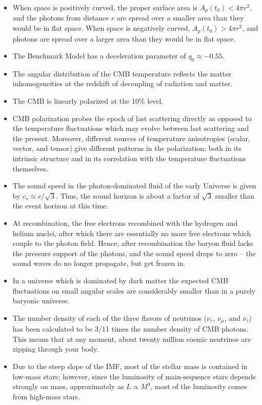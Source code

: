 \documentclass[a4paper,10pt]{article}
\begin{document}
\begin{itemize}
    \item When space is positively curved, the proper surface area is $A_p(t_0) < 4\pi r^2$, and the photons from distance $r$ are spread over a smaller area than they would be in flat space. When space is negatively curved, $A_p(t_0) > 4\pi r^2$, and photons are spread over a larger area than they would be in flat space.
    \item The Benchmark Model has a deceleration parameter of $q_0\approx−0.55$.
    \item The angular distribution of the CMB temperature reflects the matter inhomogeneities at the redshift of decoupling of radiation and matter.
    \item The CMB is linearly polarized at the 10\% level.
    \item CMB polarization probes the epoch of last scattering directly as opposed to the temperature fluctuations which may evolve between last scattering and the present. Moreover, different sources of temperature anisotropies (scalar, vector, and tensor) give different patterns in the polarization: both in its intrinsic structure and in its correlation with the temperature fluctuations themselves.
    \item The sound speed in the photon-dominated fluid of the early Universe is given by $c_s\approx c/\sqrt{3}$. Thus, the sound horizon is about a factor of $\sqrt{3}$ smaller than the event horizon at this time.
    \item At recombination, the free electrons recombined with the hydrogen and helium nuclei, after which there are essentially no more free electrons which couple to the photon field. Hence, after recombination the baryon fluid lacks the pressure support of the photons, and the sound speed drops to zero -- the sound waves do no longer propagate, but get frozen in.
    \item In a universe which is dominated by dark matter the expected CMB fluctuations on small angular scales are considerably smaller than in a purely baryonic universe.
    \item The number density of each of the three flavors of neutrinos ($\nu_e$, $\nu_\mu$, and $\nu_\tau$) has been calculated to be 3/11 times the number density of CMB photons. This means that at any moment, about twenty million cosmic neutrinos are zipping through your body.
    \item Due to the steep slope of the IMF, most of the stellar mass is contained in low-mass stars; however, since the luminosity of main-sequence stars depends strongly on mass, approximately as $L\propto M^3$, most of the luminosity comes from high-mass stars.

\end{itemize}
\end{document}
